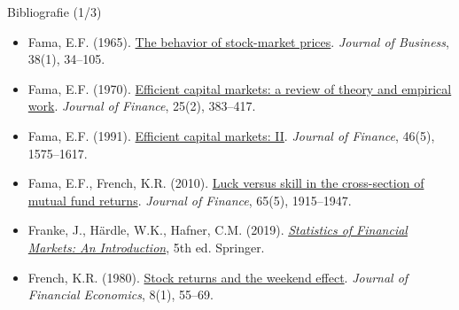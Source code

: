 \begin{frame}{Bibliografie (1/3)}
\begin{itemize}
    \item Fama, E.F. (1965). \href{https://doi.org/10.1086/294743}{The behavior of stock-market prices}. \textit{Journal of Business}, 38(1), 34--105.
    \item Fama, E.F. (1970). \href{https://doi.org/10.1111/j.1540-6261.1970.tb00518.x}{Efficient capital markets: a review of theory and empirical work}. \textit{Journal of Finance}, 25(2), 383--417.
    \item Fama, E.F. (1991). \href{https://doi.org/10.1111/j.1540-6261.1991.tb04636.x}{Efficient capital markets: II}. \textit{Journal of Finance}, 46(5), 1575--1617.
    \item Fama, E.F., French, K.R. (2010). \href{https://doi.org/10.1111/j.1540-6261.2010.01598.x}{Luck versus skill in the cross-section of mutual fund returns}. \textit{Journal of Finance}, 65(5), 1915--1947.
    \item Franke, J., Härdle, W.K., Hafner, C.M. (2019). \href{https://doi.org/10.1007/978-3-030-13751-9}{\textit{Statistics of Financial Markets: An Introduction}}, 5th ed. Springer.
    \item French, K.R. (1980). \href{https://doi.org/10.1016/0304-405X(80)90021-5}{Stock returns and the weekend effect}. \textit{Journal of Financial Economics}, 8(1), 55--69.
\end{itemize}
\end{frame}

